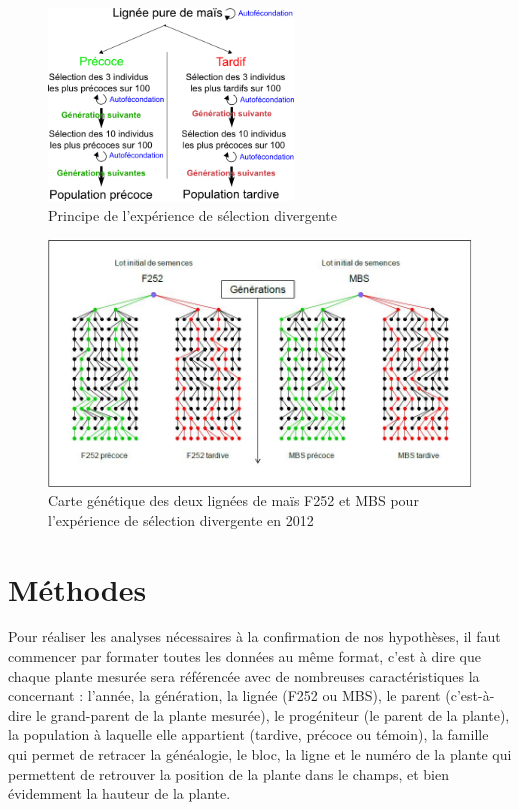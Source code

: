 \documentclass[12pt,a4paper]{report}
\begin{document}
			\begin{figure}
				\centering
				\includegraphics[width=6.5cm]{selec_div.png}
				\caption{Principe de l'expérience de sélection divergente}
				\label{selec.div}
			\end{figure}
			\begin{figure}
				\centering
				\includegraphics[width = 6.5 cm]{carte_gen.jpg}
				\caption{Carte génétique des deux lignées de maïs F252 et MBS pour l'expérience de sélection divergente en 2012}
				\label{carte_gen}
			\end{figure}
			
		\section{Méthodes}
			
			Pour réaliser les analyses nécessaires à la confirmation de nos hypothèses, il faut commencer par formater toutes les données au même format, c'est à dire que chaque plante mesurée sera référencée avec de nombreuses caractéristiques la concernant : l'année, la génération, la lignée (F252 ou MBS), le parent (c'est-à-dire le \og grand-parent \fg de la plante mesurée), le progéniteur (le parent de la plante), la population à laquelle elle appartient (tardive, précoce ou témoin), la famille qui permet de retracer la généalogie, le bloc, la ligne et le numéro de la plante qui permettent de retrouver la position de la plante dans le champs, et bien évidemment la hauteur de la plante.
			
	
	
	
	\appendix
	
\end{document}
